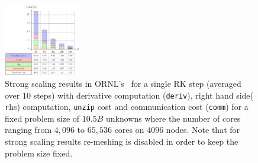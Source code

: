 \documentclass[10pt, conference]{IEEEtran} %
\begin{document}

\begin{figure}[tbh]
	\centering
	\includegraphics[width=0.3\textwidth]{plots/strong_r10}
	\caption{\small Strong scaling results in ORNL's \Titan~for a single RK step (averaged over 10 steps) with derivative computation (\texttt{deriv}), right hand side( {\texttt rhs}) computation, \texttt{unzip} cost 
		and communication cost (\texttt{comm}) for a fixed problem size of $10.5B$ unknowns where the number of cores ranging from $4,096$ to $65,536$ cores on $4096$ nodes. Note that for strong scaling results re-meshing is disabled in order to keep the problem size fixed.  \label{fig:ss_r10} }
	\vspace{-0.2in}
\end{figure}
\end{document}
